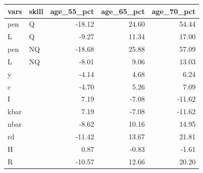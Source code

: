 \begin{tabular}{llrrr}
  \hline
vars & skill & age\_55\_pct & age\_65\_pct & age\_70\_pct \\ 
  \hline
pen & Q & -18.12 & 24.60 & 54.44 \\ 
  L & Q & -9.27 & 11.34 & 17.00 \\ 
  pen & NQ & -18.68 & 25.88 & 57.09 \\ 
  L & NQ & -8.01 & 9.06 & 13.03 \\ 
  y &  & -4.14 & 4.68 & 6.24 \\ 
  c &  & -4.70 & 5.26 & 7.09 \\ 
  I &  & 7.19 & -7.08 & -11.62 \\ 
  kbar &  & 7.19 & -7.08 & -11.62 \\ 
  nbar &  & -8.62 & 10.16 & 14.95 \\ 
  rd &  & -11.42 & 13.67 & 21.81 \\ 
  H &  & 0.87 & -0.83 & -1.61 \\ 
  R &  & -10.57 & 12.66 & 20.20 \\ 
   \hline
\end{tabular}

